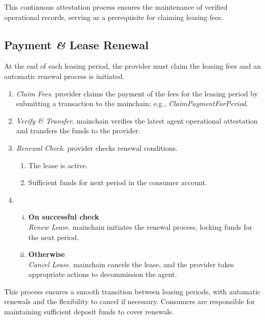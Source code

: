 \documentclass{oc}
\begin{document}
This continuous attestation process ensures the maintenance of verified operational records, serving as a prerequisite for claiming leasing fees.

\subsection{Payment \textit{\&} Lease Renewal}\label{sec:claim-renewal}

At the end of each leasing period, the \gls{provider} must claim the leasing fees and an automatic renewal process is initiated.
\begin{enumerate}
    \item \emph{Claim Fees}. \Gls{provider} claims the payment of the fees for the leasing period by submitting a transaction to the \gls{mainchain}; e.g., \textit{ClaimPaymentForPeriod}.
    \item \emph{Verify \& Transfer}. \Gls{mainchain} verifies the latest \gls{agent} operational attestation and transfers the funds to the \gls{provider}.
    \item \emph{Renewal Check}. \Gls{provider} checks renewal conditions.
      \begin{enumerate}
        \item The lease is active.
        \item Sufficient funds for next period in the \gls{consumer} account.
      \end{enumerate}
    \item
      \begin{enumerate}[(i)]
        \item \textbf{On successful check} \\
          \emph{Renew Lease}. \Gls{mainchain} initiates the renewal process, locking funds for the next period.
        \item \textbf{Otherwise} \\
          \emph{Cancel Lease}. \Gls{mainchain} cancels the lease, and the \gls{provider} takes appropriate actions to decommission the \gls{agent}.
      \end{enumerate}
\end{enumerate}

This process ensures a smooth transition between leasing periods, with automatic renewals and the flexibility to cancel if necessary.
Consumers are responsible for maintaining sufficient deposit funds to cover renewals.

\clearpage

\printglossary


\end{document}
